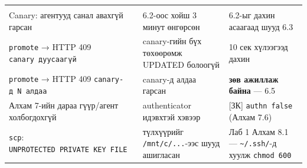 \begin{longtable}[]{@{}lll@{}}
\begin{minipage}[t]{0.30\columnwidth}
\end{minipage}\tabularnewline
\begin{minipage}[t]{0.30\columnwidth}\raggedright
Canary: агентууд санал авахгүй гарсан\strut
\end{minipage} & \begin{minipage}[t]{0.30\columnwidth}\raggedright
6.2-оос хойш 3 минут өнгөрсөн\strut
\end{minipage} & \begin{minipage}[t]{0.30\columnwidth}\raggedright
6.2-ыг дахин асаагаад шууд 6.3\strut
\end{minipage}\tabularnewline
\begin{minipage}[t]{0.30\columnwidth}\raggedright
\texttt{promote} → HTTP 409 \texttt{canary\ дуусаагүй}\strut
\end{minipage} & \begin{minipage}[t]{0.30\columnwidth}\raggedright
canary-гийн бүх төхөөрөмж UPDATED болоогүй\strut
\end{minipage} & \begin{minipage}[t]{0.30\columnwidth}\raggedright
10 сек хүлээгээд дахин\strut
\end{minipage}\tabularnewline
\begin{minipage}[t]{0.30\columnwidth}\raggedright
\texttt{promote} → HTTP 409 \texttt{canary-д\ N\ алдаа}\strut
\end{minipage} & \begin{minipage}[t]{0.30\columnwidth}\raggedright
canary-д алдаа гарсан\strut
\end{minipage} & \begin{minipage}[t]{0.30\columnwidth}\raggedright
\textbf{зөв ажиллаж байна} --- 6.5\strut
\end{minipage}\tabularnewline
\begin{minipage}[t]{0.30\columnwidth}\raggedright
Алхам 7-ийн дараа гүүр/агент холбогдохгүй\strut
\end{minipage} & \begin{minipage}[t]{0.30\columnwidth}\raggedright
authenticator идэвхтэй хэвээр\strut
\end{minipage} & \begin{minipage}[t]{0.30\columnwidth}\raggedright
{[}ЗК{]} \texttt{authn\ false} (Алхам 7.6)\strut
\end{minipage}\tabularnewline
\begin{minipage}[t]{0.30\columnwidth}\raggedright
\texttt{scp}: \texttt{UNPROTECTED\ PRIVATE\ KEY\ FILE}\strut
\end{minipage} & \begin{minipage}[t]{0.30\columnwidth}\raggedright
түлхүүрийг \texttt{/mnt/c/...}-ээс шууд ашигласан\strut
\end{minipage} & \begin{minipage}[t]{0.30\columnwidth}\raggedright
Лаб 1 Алхам 8.1 --- \texttt{\textasciitilde{}/.ssh/}-д хуулж \texttt{chmod\ 600}\strut
\end{minipage}\tabularnewline
\bottomrule
\end{longtable}\endgroup

